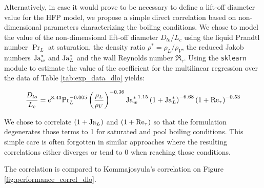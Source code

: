 Alternatively, in case it would prove to be necessary to define a lift-off diameter value for the HFP model, we propose a simple direct correlation based on non-dimensional parameters characterizing the boiling conditions. We chose to model the value of the non-dimensional lift-off diameter $D_{lo} / L_{c}$ using the liquid Prandtl number $\Pr_{L}$ at saturation, the density ratio $\rho^{*} = \rho_{L}/\rho_{V}$, the reduced Jakob numbers $\mathrm{Ja}_{w}^{*}$ and $\mathrm{Ja}_{L}^{*}$ and the wall Reynolds number $\Re_{\tau}$. Using the \texttt{sklearn} module to estimate the value of the coefficient for the multilinear regression over the data of Table \ref{tab:exp_data_dlo} yields: 

\begin{equation}
\frac{D_{lo}}{L_{c}} = e^{8.43} \mathrm{Pr}_{L}^{-0.005} \left( \frac{\rho_{L}}{\rho_{V}} \right)^{-0.36} {\mathrm{Ja}_{w}^{*}}^{1.15} \left( 1+\mathrm{Ja}_{L}^{*} \right)^{-6.68} \left( 1+\mathrm{Re}_{\tau} \right)^{-0.53}
\label{eq:correl_dlo}
\end{equation}

We chose to correlate $\left( 1+\mathrm{Ja}_{L} \right)$ and $\left( 1+\mathrm{Re}_{\tau} \right)$ so that the formulation degenerates those terms to 1 for saturated and pool boiling conditions. This simple care is often forgotten in similar approaches \cite{kommajosyula_development_2020, zhou_experimental_2020-1} where the resulting correlations either diverges or tend to 0 when reaching those conditions.

\npar

The correlation is compared to Kommajosyula's correlation \cite{kommajosyula_development_2020} on Figure \ref{fig:performance_correl_dlo}. 

